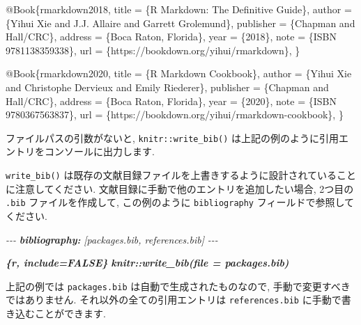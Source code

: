 \documentclass[
  11pt,
  lualatex,ja=standard,jafont=noto]{bxjsreport}
\newenvironment{Shaded}{\begin{snugshade}}{\end{snugshade}}
\newcommand{\AnnotationTok}[1]{\textcolor[rgb]{0.56,0.35,0.01}{\textbf{\textit{#1}}}}
\newcommand{\CommentTok}[1]{\textcolor[rgb]{0.56,0.35,0.01}{\textit{#1}}}
\newcommand{\DataTypeTok}[1]{\textcolor[rgb]{0.13,0.29,0.53}{#1}}
\newcommand{\InformationTok}[1]{\textcolor[rgb]{0.56,0.35,0.01}{\textbf{\textit{#1}}}}
\newcommand{\NormalTok}[1]{#1}
\newcommand{\OtherTok}[1]{\textcolor[rgb]{0.56,0.35,0.01}{#1}}
\newcommand{\VariableTok}[1]{\textcolor[rgb]{0.00,0.00,0.00}{#1}}
\begin{document}
\begin{Shaded}
\begin{Highlighting}[]
\VariableTok{@Book}\NormalTok{\{}\OtherTok{rmarkdown2018}\NormalTok{,}
  \DataTypeTok{title}\NormalTok{ = \{R Markdown: The Definitive Guide\},}
  \DataTypeTok{author}\NormalTok{ = \{Yihui Xie and J.J. Allaire and Garrett}
\NormalTok{    Grolemund\},}
  \DataTypeTok{publisher}\NormalTok{ = \{Chapman and Hall/CRC\},}
  \DataTypeTok{address}\NormalTok{ = \{Boca Raton, Florida\},}
  \DataTypeTok{year}\NormalTok{ = \{2018\},}
  \DataTypeTok{note}\NormalTok{ = \{ISBN 9781138359338\},}
  \DataTypeTok{url}\NormalTok{ = \{https://bookdown.org/yihui/rmarkdown\},}
\NormalTok{\}}

\VariableTok{@Book}\NormalTok{\{}\OtherTok{rmarkdown2020}\NormalTok{,}
  \DataTypeTok{title}\NormalTok{ = \{R Markdown Cookbook\},}
  \DataTypeTok{author}\NormalTok{ = \{Yihui Xie and Christophe Dervieux and Emily}
\NormalTok{    Riederer\},}
  \DataTypeTok{publisher}\NormalTok{ = \{Chapman and Hall/CRC\},}
  \DataTypeTok{address}\NormalTok{ = \{Boca Raton, Florida\},}
  \DataTypeTok{year}\NormalTok{ = \{2020\},}
  \DataTypeTok{note}\NormalTok{ = \{ISBN 9780367563837\},}
  \DataTypeTok{url}\NormalTok{ = \{https://bookdown.org/yihui/rmarkdown{-}cookbook\},}
\NormalTok{\}}
\end{Highlighting}
\end{Shaded}

ファイルパスの引数がないと, \texttt{knitr::write\_bib()} は上記の例のように引用エントリをコンソールに出力します.

\texttt{write\_bib()} は既存の文献目録ファイルを上書きするように設計されていることに注意してください. 文献目録に手動で他のエントリを追加したい場合, 2つ目の \texttt{.bib} ファイルを作成して, この例のように \texttt{bibliography} フィールドで参照してください.

\begin{Shaded}
\begin{Highlighting}[]
\CommentTok{{-}{-}{-}}
\AnnotationTok{bibliography:}\CommentTok{ [packages.bib, references.bib]}
\CommentTok{{-}{-}{-}}

\InformationTok{\textasciigrave{}\textasciigrave{}\textasciigrave{}\{r, include=FALSE\}}
\InformationTok{knitr::write\_bib(file = \textquotesingle{}packages.bib\textquotesingle{})}
\InformationTok{\textasciigrave{}\textasciigrave{}\textasciigrave{}}
\end{Highlighting}
\end{Shaded}

上記の例では \texttt{packages.bib} は自動で生成されたものなので, 手動で変更すべきではありません. それ以外の全ての引用エントリは \texttt{references.bib} に手動で書き込むことができます.
\end{document}
